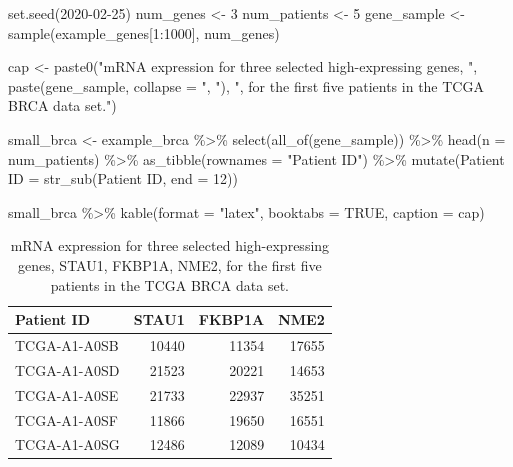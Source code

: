 \documentclass{article}
\newenvironment{Shaded}{\begin{snugshade}}{\end{snugshade}}
\newcommand{\AttributeTok}[1]{\textcolor[rgb]{0.77,0.63,0.00}{#1}}
\newcommand{\ConstantTok}[1]{\textcolor[rgb]{0.00,0.00,0.00}{#1}}
\newcommand{\DecValTok}[1]{\textcolor[rgb]{0.00,0.00,0.81}{#1}}
\newcommand{\FunctionTok}[1]{\textcolor[rgb]{0.00,0.00,0.00}{#1}}
\newcommand{\NormalTok}[1]{#1}
\newcommand{\OtherTok}[1]{\textcolor[rgb]{0.56,0.35,0.01}{#1}}
\newcommand{\SpecialCharTok}[1]{\textcolor[rgb]{0.00,0.00,0.00}{#1}}
\newcommand{\StringTok}[1]{\textcolor[rgb]{0.31,0.60,0.02}{#1}}
\begin{document}
\begin{Shaded}
\begin{Highlighting}[]
\FunctionTok{set.seed}\NormalTok{(}\DecValTok{2020{-}02{-}25}\NormalTok{)}
\NormalTok{num\_genes    }\OtherTok{\textless{}{-}} \DecValTok{3}
\NormalTok{num\_patients }\OtherTok{\textless{}{-}} \DecValTok{5}
\NormalTok{gene\_sample  }\OtherTok{\textless{}{-}} \FunctionTok{sample}\NormalTok{(example\_genes[}\DecValTok{1}\SpecialCharTok{:}\DecValTok{1000}\NormalTok{], num\_genes)}

\NormalTok{cap }\OtherTok{\textless{}{-}} \FunctionTok{paste0}\NormalTok{(}\StringTok{"mRNA expression for three selected high{-}expressing genes, "}\NormalTok{,}
              \FunctionTok{paste}\NormalTok{(gene\_sample, }\AttributeTok{collapse =} \StringTok{", "}\NormalTok{), }
              \StringTok{", for the first five patients in the TCGA BRCA data set."}\NormalTok{)}

\NormalTok{small\_brca }\OtherTok{\textless{}{-}}\NormalTok{ example\_brca }\SpecialCharTok{\%\textgreater{}\%}
  \FunctionTok{select}\NormalTok{(}\FunctionTok{all\_of}\NormalTok{(gene\_sample)) }\SpecialCharTok{\%\textgreater{}\%}
  \FunctionTok{head}\NormalTok{(}\AttributeTok{n =}\NormalTok{ num\_patients) }\SpecialCharTok{\%\textgreater{}\%}
  \FunctionTok{as\_tibble}\NormalTok{(}\AttributeTok{rownames =} \StringTok{"Patient ID"}\NormalTok{) }\SpecialCharTok{\%\textgreater{}\%}
  \FunctionTok{mutate}\NormalTok{(}\StringTok{\textasciigrave{}}\AttributeTok{Patient ID}\StringTok{\textasciigrave{}} \OtherTok{=} \FunctionTok{str\_sub}\NormalTok{(}\StringTok{\textasciigrave{}}\AttributeTok{Patient ID}\StringTok{\textasciigrave{}}\NormalTok{, }\AttributeTok{end =} \DecValTok{12}\NormalTok{))}

\NormalTok{small\_brca }\SpecialCharTok{\%\textgreater{}\%}
  \FunctionTok{kable}\NormalTok{(}\AttributeTok{format =} \StringTok{"latex"}\NormalTok{, }\AttributeTok{booktabs =} \ConstantTok{TRUE}\NormalTok{, }\AttributeTok{caption =}\NormalTok{ cap)}
\end{Highlighting}
\end{Shaded}

\begin{table}

\caption{\label{tab:ch010-realDataTab}mRNA expression for three selected high-expressing genes, STAU1, FKBP1A, NME2, for the first five patients in the TCGA BRCA data set.}
\centering
\begin{tabular}[t]{lrrr}
\toprule
Patient ID & STAU1 & FKBP1A & NME2\\
\midrule
TCGA-A1-A0SB & 10440 & 11354 & 17655\\
TCGA-A1-A0SD & 21523 & 20221 & 14653\\
TCGA-A1-A0SE & 21733 & 22937 & 35251\\
TCGA-A1-A0SF & 11866 & 19650 & 16551\\
TCGA-A1-A0SG & 12486 & 12089 & 10434\\
\bottomrule
\end{tabular}
\end{table}
\end{document}
